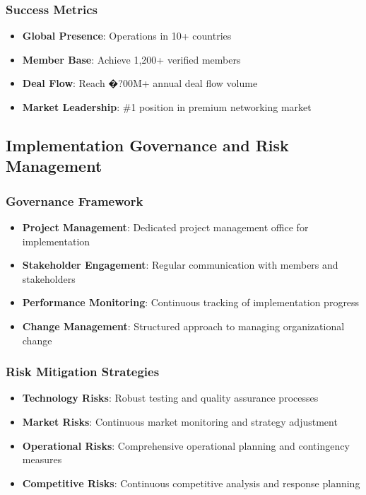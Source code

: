 \subsubsection{Success Metrics}
\begin{itemize}
    \item \textbf{Global Presence}: Operations in 10+ countries
    \item \textbf{Member Base}: Achieve 1,200+ verified members
    \item \textbf{Deal Flow}: Reach �?00M+ annual deal flow volume
    \item \textbf{Market Leadership}: \#1 position in premium networking market
\end{itemize}

\subsection{Implementation Governance and Risk Management}

\subsubsection{Governance Framework}
\begin{itemize}
    \item \textbf{Project Management}: Dedicated project management office for implementation
    \item \textbf{Stakeholder Engagement}: Regular communication with members and stakeholders
    \item \textbf{Performance Monitoring}: Continuous tracking of implementation progress
    \item \textbf{Change Management}: Structured approach to managing organizational change
\end{itemize}

\subsubsection{Risk Mitigation Strategies}
\begin{itemize}
    \item \textbf{Technology Risks}: Robust testing and quality assurance processes
    \item \textbf{Market Risks}: Continuous market monitoring and strategy adjustment
    \item \textbf{Operational Risks}: Comprehensive operational planning and contingency measures
    \item \textbf{Competitive Risks}: Continuous competitive analysis and response planning
\end{itemize}

